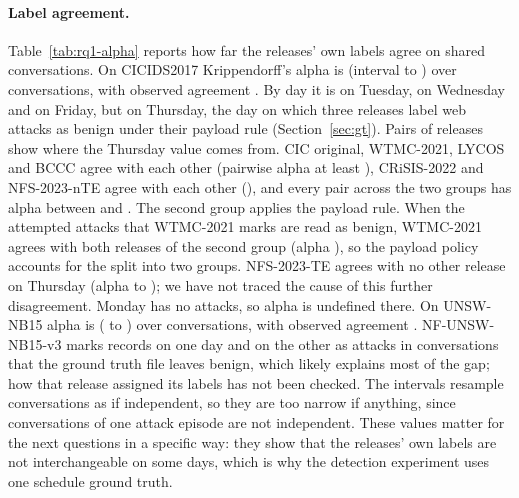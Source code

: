 \documentclass[pdflatex,sn-mathphys-num]{sn-jnl}
\newcommand{\cicids}{CICIDS2017}
\theoremstyle{thmstyleone}%
\theoremstyle{thmstylethree}%
\begin{document}
\paragraph{Label agreement.} Table~\ref{tab:rq1-alpha} reports how far the releases' own labels agree on shared conversations. On \cicids{} Krippendorff's alpha is \RQoneAlphaCic{} (interval \RQoneAlphaCicLo{} to \RQoneAlphaCicHi{}) over \RQoneAlphaCicUnits{} conversations, with observed agreement \RQoneAlphaCicObs{}. By day it is \RQoneAlphaTuesday{} on Tuesday, \RQoneAlphaWednesday{} on Wednesday and \RQoneAlphaFriday{} on Friday, but \RQoneAlphaThursday{} on Thursday, the day on which three releases label web attacks as benign under their payload rule (Section~\ref{sec:gt}). Pairs of releases show where the Thursday value comes from. CIC original, WTMC-2021, LYCOS and BCCC agree with each other (pairwise alpha at least \RQoneThuWithinMin{}), CRiSIS-2022 and NFS-2023-nTE agree with each other (\RQoneThuGroupTwo{}), and every pair across the two groups has alpha between \RQoneThuCrossMin{} and \RQoneThuCrossMax{}. The second group applies the payload rule. When the attempted attacks that WTMC-2021 marks are read as benign, WTMC-2021 agrees with both releases of the second group (alpha \RQoneThuWtmcAttBenign{}), so the payload policy accounts for the split into two groups. NFS-2023-TE agrees with no other release on Thursday (alpha \RQoneThuTeMin{} to \RQoneThuTeMax{}); we have not traced the cause of this further disagreement. Monday has no attacks, so alpha is undefined there. On UNSW-NB15 alpha is \RQoneAlphaUnsw{} (\RQoneAlphaUnswLo{} to \RQoneAlphaUnswHi{}) over \RQoneAlphaUnswUnits{} conversations, with observed agreement \RQoneAlphaUnswObs{}. NF-UNSW-NB15-v3 marks \RQoneVthreeExtraA{} records on one day and \RQoneVthreeExtraB{} on the other as attacks in conversations that the ground truth file leaves benign, which likely explains most of the gap; how that release assigned its labels has not been checked. The intervals resample conversations as if independent, so they are too narrow if anything, since conversations of one attack episode are not independent. These values matter for the next questions in a specific way: they show that the releases' own labels are not interchangeable on some days, which is why the detection experiment uses one schedule ground truth.


\end{document}
